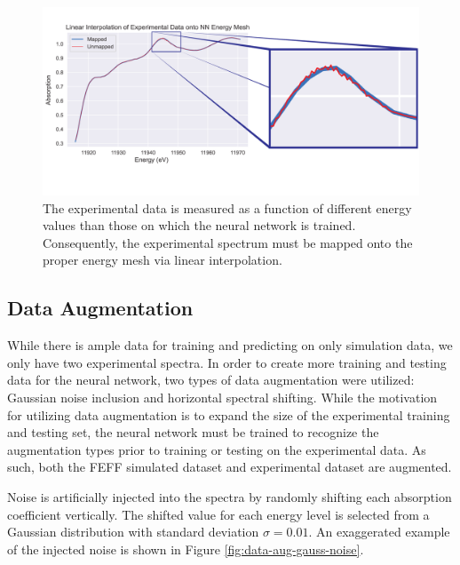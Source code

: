 \begin{figure}
    \centering
    \includegraphics[width=\linewidth]{Chapters/Figures/quality-of-interpolation-skinny.pdf}
    \caption[Experimental Data Interpolation]{The experimental data is measured as a function of different energy values than those on which the neural network is trained. Consequently, the experimental spectrum must be mapped onto the proper energy mesh via linear interpolation.}
    \label{fig:interpolation-skinny}
\end{figure}

\subsection{Data Augmentation}
While there is ample data for training and predicting on only simulation data, we only have two experimental spectra. In order to create more training and testing data for the neural network, two types of data augmentation were utilized: Gaussian noise inclusion and horizontal spectral shifting. While the motivation for utilizing data augmentation is to expand the size of the experimental training and testing set, the neural network must be trained to recognize the augmentation types prior to training or testing on the experimental data. As such, both the FEFF simulated dataset and experimental dataset are augmented.

Noise is artificially injected into the spectra by randomly shifting each absorption coefficient vertically. The shifted value for each energy level is selected from a Gaussian distribution with standard deviation $ \sigma=0.01 $. An exaggerated example of the injected noise is shown in Figure \ref{fig:data-aug-gauss-noise}.

